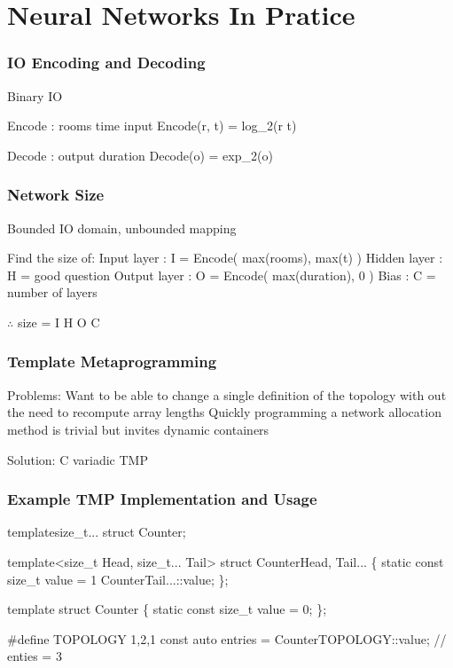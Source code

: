 \section{Neural Networks In Pratice}

\begin{frame}
	\begin{center}
		\frametitle{IO Encoding and Decoding}
	\end{center}
	Binary IO

	Encode : rooms \times time \mapsto input
	Encode(r, t) = log_{2}(r \ast t)

	Decode : output \mapsto duration
	Decode(o) = exp_{2}(o)
\end{frame}

\begin{frame}
	\begin{center}
		\frametitle{Network Size}
	\end{center}
	Bounded IO domain, unbounded mapping
	
	Find the size of:
	Input layer : I = Encode( max(rooms), max(t) )
	Hidden layer : H = good question
	Output layer : O = Encode( max(duration), 0 )
	Bias : C = number of layers 
	
	$\therefore$ size = I \+ H \+ O \+ C
\end{frame}

\begin{frame}
	\begin{center}
		\frametitle{Template Metaprogramming}
	\end{center}
	Problems:
	Want to be able to change a single definition of the topology with out the need to recompute array lengths
	Quickly programming a network allocation method is trivial but invites dynamic containers
	
	Solution:
	C\+ variadic TMP
\end{frame}

\begin{frame}
	\begin{center}
		\frametitle{Example TMP Implementation and Usage}
	\end{center}
	template\<size\_t...\>
	struct Counter;

	template<size\_t Head, size\_t... Tail>
	struct Counter\<Head, Tail...\>
	\{ static const size\_t value = 1 \+ Counter\<Tail...\>::value; \};

	template\<\>
	struct Counter\<\>
	\{ static const size\_t value = 0; \};
	
	\#define TOPOLOGY 1,2,1
	const auto entries = Counter\<TOPOLOGY\>::value; // enties = 3
\end{frame}

